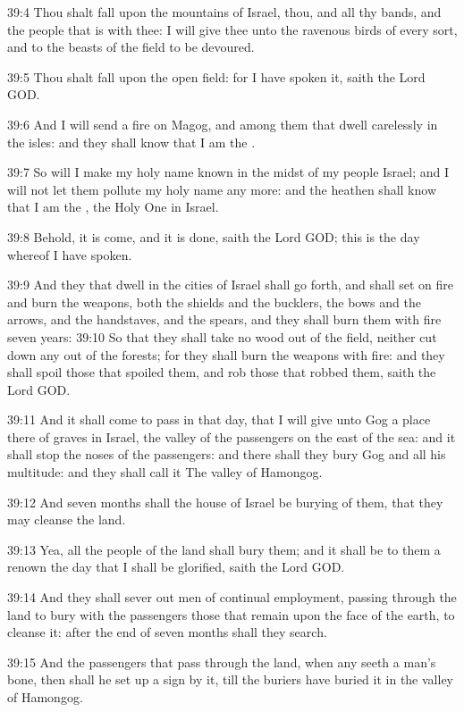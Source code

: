 39:4 Thou shalt fall upon the mountains of Israel, thou, and all thy
bands, and the people that is with thee: I will give thee unto the
ravenous birds of every sort, and to the beasts of the field to be
devoured.

39:5 Thou shalt fall upon the open field: for I have spoken it, saith
the Lord GOD.

39:6 And I will send a fire on Magog, and among them that dwell
carelessly in the isles: and they shall know that I am the \LORD.

39:7 So will I make my holy name known in the midst of my people
Israel; and I will not let them pollute my holy name any more: and the
heathen shall know that I am the \LORD, the Holy One in Israel.

39:8 Behold, it is come, and it is done, saith the Lord GOD; this is
the day whereof I have spoken.

39:9 And they that dwell in the cities of Israel shall go forth, and
shall set on fire and burn the weapons, both the shields and the
bucklers, the bows and the arrows, and the handstaves, and the spears,
and they shall burn them with fire seven years: 39:10 So that they
shall take no wood out of the field, neither cut down any out of the
forests; for they shall burn the weapons with fire: and they shall
spoil those that spoiled them, and rob those that robbed them, saith
the Lord GOD.

39:11 And it shall come to pass in that day, that I will give unto Gog
a place there of graves in Israel, the valley of the passengers on the
east of the sea: and it shall stop the noses of the passengers: and
there shall they bury Gog and all his multitude: and they shall call
it The valley of Hamongog.

39:12 And seven months shall the house of Israel be burying of them,
that they may cleanse the land.

39:13 Yea, all the people of the land shall bury them; and it shall be
to them a renown the day that I shall be glorified, saith the Lord
GOD.

39:14 And they shall sever out men of continual employment, passing
through the land to bury with the passengers those that remain upon
the face of the earth, to cleanse it: after the end of seven months
shall they search.

39:15 And the passengers that pass through the land, when any seeth a
man's bone, then shall he set up a sign by it, till the buriers have
buried it in the valley of Hamongog.

